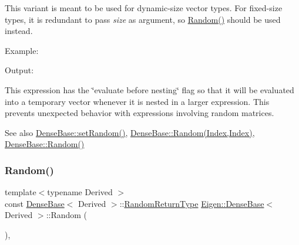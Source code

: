 This variant is meant to be used for dynamic-\/size vector types. For fixed-\/size types, it is redundant to pass {\itshape size} as argument, so \mbox{\hyperlink{class_eigen_1_1_dense_base_ae814abb451b48ed872819192dc188c19}{Random()}} should be used instead.

Example\+: 
\begin{DoxyCodeInclude}{0}
\end{DoxyCodeInclude}
 Output\+: 
\begin{DoxyVerbInclude}
\end{DoxyVerbInclude}


This expression has the \char`\"{}evaluate before nesting\char`\"{} flag so that it will be evaluated into a temporary vector whenever it is nested in a larger expression. This prevents unexpected behavior with expressions involving random matrices.

\begin{DoxySeeAlso}{See also}
\mbox{\hyperlink{class_eigen_1_1_dense_base_ac476e5852129ba32beaa1a8a3d7ee0db}{Dense\+Base\+::set\+Random()}}, \mbox{\hyperlink{class_eigen_1_1_dense_base_ae97f8d9d08f969c733c8144be6225756}{Dense\+Base\+::\+Random(\+Index,\+Index)}}, \mbox{\hyperlink{class_eigen_1_1_dense_base_ae814abb451b48ed872819192dc188c19}{Dense\+Base\+::\+Random()}} 
\end{DoxySeeAlso}
\mbox{\label{class_eigen_1_1_dense_base_ae814abb451b48ed872819192dc188c19}} 
\subsubsection{\texorpdfstring{Random()}{Random()}\hspace{0.1cm}{\footnotesize\ttfamily [3/3]}}
{\footnotesize\ttfamily template$<$typename Derived $>$ \\
const \mbox{\hyperlink{class_eigen_1_1_dense_base}{Dense\+Base}}$<$ Derived $>$\+::\mbox{\hyperlink{class_eigen_1_1_cwise_nullary_op}{Random\+Return\+Type}} \mbox{\hyperlink{class_eigen_1_1_dense_base}{Eigen\+::\+Dense\+Base}}$<$ Derived $>$\+::Random (\begin{DoxyParamCaption}{ }\end{DoxyParamCaption})\hspace{0.3cm}{\ttfamily [inline]}, {\ttfamily [static]}}

